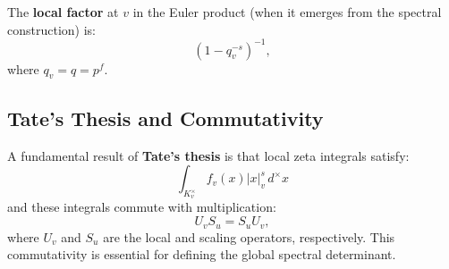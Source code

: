 The \textbf{local factor} at $v$ in the Euler product (when it emerges from the spectral construction) is:
\[
\left(1 - q_v^{-s}\right)^{-1},
\]
where $q_v = q = p^f$.

\subsection{Tate's Thesis and Commutativity}

A fundamental result of \textbf{Tate's thesis} \cite{tate1967} is that local zeta integrals satisfy:
\[
\int_{K_v^\times} f_v(x) |x|_v^s \, d^\times x
\]
and these integrals commute with multiplication:
\[
U_v S_u = S_u U_v,
\]
where $U_v$ and $S_u$ are the local and scaling operators, respectively. This commutativity is essential for defining the global spectral determinant.
